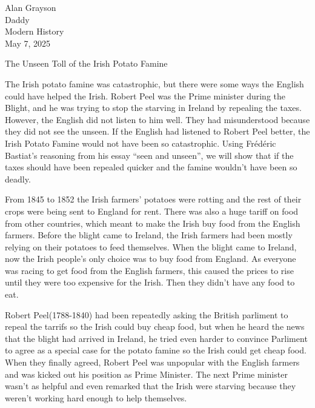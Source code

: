 \documentclass[12pt]{article}
\begin{document}
\begin{flushleft}

Alan Grayson\\
Daddy\\
Modern History\\
May 7, 2025\\


\begin{center}
The Unseen Toll of the Irish Potato Famine
\end{center}

\setlength{\parindent}{0.5in}

The Irish potato famine was catastrophic, but there were some ways the
English could have helped the Irish.  Robert Peel was the Prime
minister during the Blight, and he was trying to stop the starving in
Ireland by repealing the taxes. However, the English did not listen to
him well. They had misunderstood because they did not see the
unseen. If the English had listened to Robert Peel better, the Irish
Potato Famine would not have been so catastrophic. Using Frédéric
Bastiat's reasoning from his essay ``seen and unseen'', we will show
that if the taxes should have been repealed quicker and the famine
wouldn't have been so deadly.


From 1845 to 1852 the Irish farmers' potatoes were rotting and the
rest of their crops were being sent to England for rent. There was
also a huge tariff on food from other countries, which meant to make
the Irish buy food from the English farmers. Before the
blight came to Ireland, the Irish farmers had been mostly relying on
their potatoes to feed themselves. When the blight came to Ireland,
now the Irish people's only choice was to buy food from England. As
everyone was racing to get food from the English farmers, this caused
the prices to rise until they were too expensive for the Irish. Then
they didn't have any food to eat.



Robert Peel(1788-1840) had been repeatedly asking the British
parliment to repeal the tarrifs so the Irish could buy cheap food, but
when he heard the news that the blight had arrived in Ireland, he
tried even harder to convince Parliment to agree as a special case for
the potato famine so the Irish could get cheap food. When they finally
agreed, Robert Peel was unpopular with the English farmers and was
kicked out his position as Prime Minister. The next Prime minister
wasn't as helpful and even remarked that the Irish were starving
because they weren't working hard enough to help themselves.




\end{flushleft}
\end{document}
